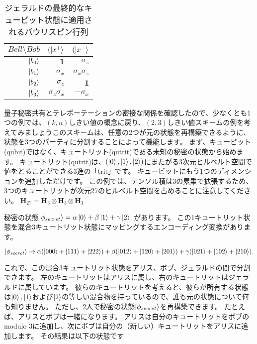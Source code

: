 \begin{table}[htb]
\caption{ジェラルドの最終的なキュービット状態に適用されるパウリスピン行列}
\centering
\begin{tabular}{|r|r|r|} \hline
$Bell \setminus Bob$  & $(\ket{x^+}$ & $(\ket{x^-}$ \\ \hline
$\ket{b_0}$ & $ \mathbf{1}$ & $\sigma_z$ \\
$\ket{b_1}$ & $ \sigma_x$ & $\sigma_x \sigma_z$ \\
$\ket{b_2}$ & $\sigma_z$  & $\mathbf{1}$ \\
$\ket{b_3}$ & $\sigma_z \sigma_x$  & $- \sigma_x$ \\ \hline
\end{tabular}
\end{table} 



量子秘密共有とテレポーテーションの密接な関係を確認したので、少なくとも1つの例では、$(k,n)$しきい値の概念に戻り、$(2,3)$しきい値スキームの例を考えてみましょうこのスキームは、任意の2つが元の状態を再構築できるように、状態を3つのパーティに分割することによって機能します。
まず、キュービット(qubit)ではなく、キュートリット(qutrit)である未知の秘密の状態から始めます。
キュートリット(qutrit)は、$(\ket{0}, \ket{1},\ket{2} )$にまたがる3次元ヒルベルト空間で値をとることができる3進の「trit」です。
キュービットにもう1つのディメンションを追加しただけです。 この例では、テンソル積は3の累乗で拡張するため、3つのキュートリットが次元27のヒルベルト空間を占めることに注意してください。
$\mathbf{H}_{27} = \mathbf{H}_{3} \otimes \mathbf{H}_{3} \otimes \mathbf{H}_{3} $

秘密の状態$\ket{\phi_{secret}} = \alpha \ket{0} + \beta \ket{1} + \gamma \ket{2}.$があります。 この1キュートリット状態を混合3キュートリット状態にマッピングするエンコーディング変換があります。


\begin{equation}
\label{228}
\ket{\phi_{secret}} 
\to
\alpha(\ket{000} + \ket{111} + \ket{222})
+ \beta (\ket{012} + \ket{120} + \ket{201})
+ \gamma (\ket{021} + \ket{102} + \ket{210}).
\end{equation}


これで、この混合3キュートリット状態をアリス、ボブ、ジェラルドの間で分割できます。 左のキュートリットはアリスに属し、右のキュートリットはジェラルドに属しています。 彼らのキュートリットを考えると、彼らが所有する状態は$\ket{0},\ket{1}$および$\ket{2}$の等しい混合物を持っているので、誰も元の状態について何も知りません。
ただし、2人で秘密の状態$\ket{\phi_{secret}} $を再構築できます。 たとえば、アリスとボブは一緒になります。 アリスは自分のキュートリットをボブのmodulo 3に追加し、次にボブは自分の（新しい）キュートリットをアリスに追加します。 その結果は以下の状態です

